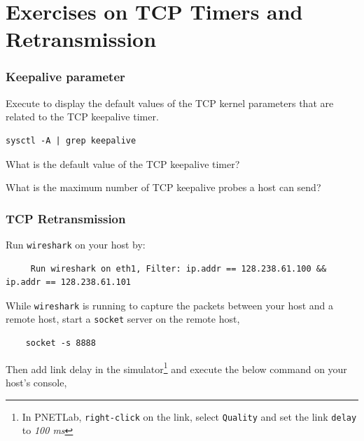 \documentclass{UTNetLab}
\begin{document}
\part{Exercises on TCP Timers and Retransmission}
\section{Keepalive parameter}
Execute  to display the default values of the TCP kernel parameters that are related to the TCP keepalive timer.
	
	\begin{lstlisting}[emph={your-host, remote-host}]
	sysctl -A | grep keepalive
	\end{lstlisting}

    \begin{report}
        \item What is the default value of the TCP keepalive timer?
        
        \item What is the maximum number of TCP keepalive probes a host can send?
    \end{report}

\section{TCP Retransmission}
Run \lstinline{wireshark} on your host by:
		
     \begin{lstlisting}
     Run wireshark on eth1, Filter: ip.addr == 128.238.61.100 && ip.addr == 128.238.61.101

     \end{lstlisting}  
While \lstinline{wireshark}  is running to capture the packets between your host and a remote host, start a \lstinline{socket} server on the remote host,

	\begin{lstlisting}
	socket -s 8888
	\end{lstlisting}
Then add link delay in the simulator\footnote{In PNETLab, \lstinline{right-click} on the link, select \lstinline{Quality} and set the link \lstinline{delay} to \textit{100 ms}} and execute the below command on your host's console,
	
\end{document}
